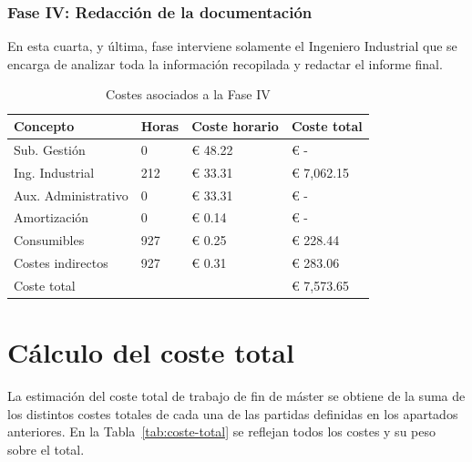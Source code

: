 \subsubsection{Fase IV: Redacción de la documentación}

En esta cuarta, y última, fase interviene solamente el Ingeniero Industrial que se encarga de analizar toda la información recopilada y redactar el informe final.

\begin{table}[H]
    \centering
    \begin{tabular}{llll}
        \toprule
        Concepto            & Horas & Coste horario & Coste total \\
        \midrule
        Sub. Gestión        & 0     & € 48.22       & € -         \\
        Ing. Industrial     & 212   & € 33.31       & € 7,062.15  \\
        Aux. Administrativo & 0     & € 33.31       & € -         \\
        Amortización        & 0     & € 0.14        & € -         \\
        Consumibles         & 927   & € 0.25        & € 228.44    \\
        Costes indirectos   & 927   & € 0.31        & € 283.06    \\
        \midrule
        Coste total         &       &               & € 7,573.65  \\
        \bottomrule
    \end{tabular}
    \caption{Costes asociados a la Fase IV}
    \label{tab:fase-redaccion}
\end{table}

\section{Cálculo del coste total}

La estimación del coste total de trabajo de fin de máster se obtiene de la suma de los distintos costes totales de cada una de las partidas definidas en los apartados anteriores.
En la Tabla~\ref{tab:coste-total} se reflejan todos los costes y su peso sobre el total.

